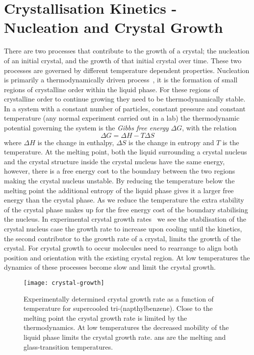 \section{Crystallisation Kinetics - Nucleation and Crystal Growth}

There are two processes that contribute to the growth of a crystal; the nucleation of an initial crystal, and the growth of that initial crystal over time. These two processes are governed by different temperature dependent properties. Nucleation is primarily a thermodynamically driven process~\cite{wu:04}, it is the formation of small regions of crystalline order within the liquid phase. For these regions of crystalline order to continue growing they need to be thermodynamically stable. In a system with a constant number of particles, constant pressure and constant temperature (any normal experiment carried out in a lab) the thermodynamic potential governing the system is the \emph{Gibbs free energy} $\Delta G$, with the relation 
\begin{equation}
\Delta G = \Delta H - T\Delta S
\end{equation}
where $\Delta H$ is the change in enthalpy, $\Delta S$ is the change in entropy and $T$ is the temperature. At the melting point, both the liquid surrounding a crystal nucleus and the crystal structure inside the crystal nucleus have the same energy, however, there is a free energy cost to the boundary between the two regions making the crystal nucleus unstable. By reducing the temperature below the melting point the additional entropy of the liquid phase gives it a larger free energy than the crystal phase. As we reduce the temperature the extra stability of the crystal phase makes up for the free energy cost of the boundary stabilising the nucleus. In experimental crystal growth rates~ we see the stabilisation of the crystal nucleus case the growth rate to increase upon cooling until the kinetics, the second contributor to the growth rate of a crystal, limits the growth of the crystal. For crystal growth to occur molecules need to rearrange to align both position and orientation with the existing crystal region. At low temperatures the dynamics of these processes become slow and limit the crystal growth.

\begin{figure}
    \centering
    \texttt{[image: crystal-growth]}
    \caption{Experimentally determined crystal growth rate as a function of temperature for supercooled tri-(napthylbenzene). Close to the melting point the crystal growth rate is limited by the thermodynamics. At low temperatures the decreased mobility of the liquid phase limits the crystal growth rate. \si{\Tm} ans \si{\Tg} are the melting and glass-transition temperatures.}
    \label{fig:crys growth}
\end{figure}


